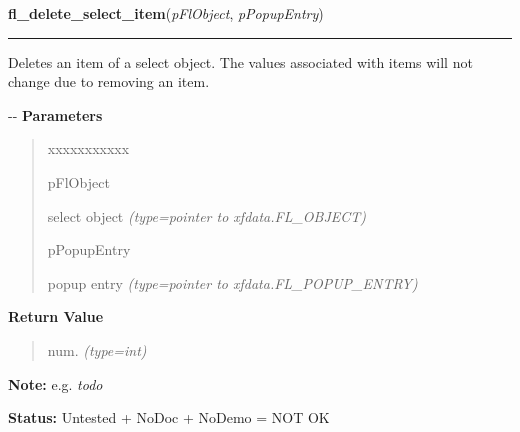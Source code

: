     \label{xformslib:flselect:fl_delete_select_item}

    \vspace{0.5ex}

\hspace{.8\funcindent}\begin{boxedminipage}{\funcwidth}

    \raggedright \textbf{fl\_delete\_select\_item}(\textit{pFlObject}, \textit{pPopupEntry})

    \vspace{-1.5ex}

    \rule{\textwidth}{0.5\fboxrule}
\setlength{\parskip}{2ex}

Deletes an item of a select object. The values associated with items
will not change due to removing an item.

-{}-
\setlength{\parskip}{1ex}
      \textbf{Parameters}
      \vspace{-1ex}

      \begin{quote}
        \begin{Ventry}{xxxxxxxxxxx}

          \item[pFlObject]


select object
            {\it (type=pointer to xfdata.FL\_OBJECT)}

          \item[pPopupEntry]


popup entry
            {\it (type=pointer to xfdata.FL\_POPUP\_ENTRY)}

        \end{Ventry}

      \end{quote}

      \textbf{Return Value}
    \vspace{-1ex}

      \begin{quote}

num.
      {\it (type=int)}

      \end{quote}

\textbf{Note:} 
e.g. \emph{todo}


\textbf{Status:} 
Untested + NoDoc + NoDemo = NOT OK


    \end{boxedminipage}

